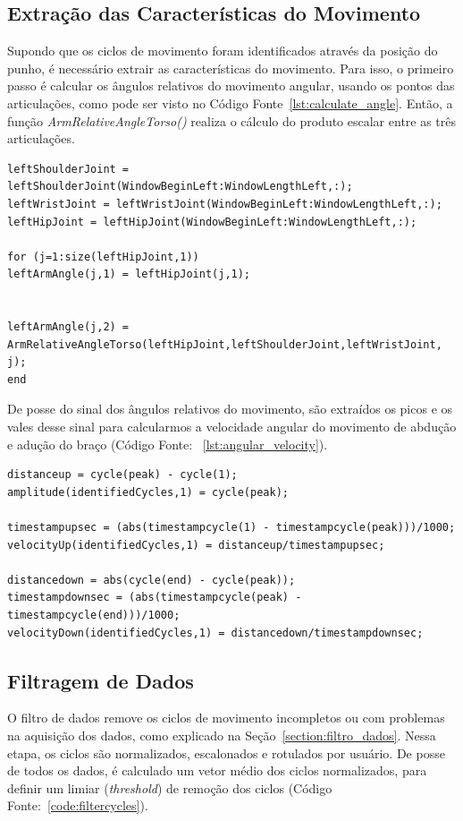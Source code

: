 \subsection{Extração das Características do Movimento}
Supondo que os ciclos de movimento foram identificados através da posição do punho, é necessário extrair as características do movimento. Para isso, o primeiro passo é calcular os ângulos relativos do movimento angular, usando os pontos das articulações, como pode ser visto no Código Fonte~\ref{lst:calculate_angle}. Então, a função \textit{ArmRelativeAngleTorso()} realiza o cálculo do produto escalar entre as três articulações.

\begin{lstlisting}[frame=single, caption=Calcular ângulos relativos do movimento, label=lst:calculate_angle]
leftShoulderJoint = leftShoulderJoint(WindowBeginLeft:WindowLengthLeft,:);
leftWristJoint = leftWristJoint(WindowBeginLeft:WindowLengthLeft,:);  
leftHipJoint = leftHipJoint(WindowBeginLeft:WindowLengthLeft,:);  

for (j=1:size(leftHipJoint,1))
leftArmAngle(j,1) = leftHipJoint(j,1);
        

leftArmAngle(j,2) = ArmRelativeAngleTorso(leftHipJoint,leftShoulderJoint,leftWristJoint, j);    
end
\end{lstlisting}

De posse do sinal dos ângulos relativos do movimento, são extraídos os picos e os vales desse sinal para calcularmos a velocidade angular do movimento de abdução e adução do braço (Código Fonte: ~\ref{lst:angular_velocity}).
    
\begin{lstlisting}[frame=single, caption=Calcular Velociodade Angular Adução e Abdução, label=lst:angular_velocity]	
distanceup = cycle(peak) - cycle(1);
amplitude(identifiedCycles,1) = cycle(peak);
    
timestampupsec = (abs(timestampcycle(1) - timestampcycle(peak)))/1000;
velocityUp(identifiedCycles,1) = distanceup/timestampupsec;

distancedown = abs(cycle(end) - cycle(peak));
timestampdownsec = (abs(timestampcycle(peak) - timestampcycle(end)))/1000;
velocityDown(identifiedCycles,1) = distancedown/timestampdownsec;
\end{lstlisting}	
		
\subsection{Filtragem de Dados}
O filtro de dados remove os ciclos de movimento incompletos ou com problemas na aquisição dos dados, como explicado na Seção~\ref{section:filtro_dados}. Nessa etapa, os ciclos são normalizados, escalonados e rotulados por usuário. 
De posse de todos os dados, é calculado um vetor médio dos ciclos normalizados, para definir um limiar (\textit{threshold}) de remoção dos ciclos (Código Fonte:~\ref{code:filtercycles}).

